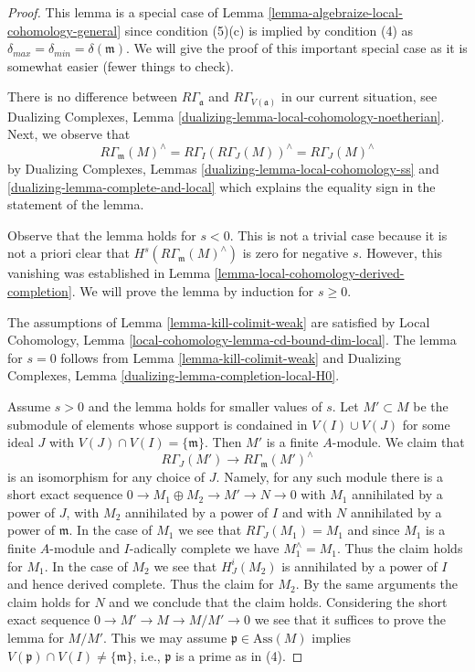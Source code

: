 \documentclass{stacks-project}
\theoremstyle{plain}
\theoremstyle{definition}
\theoremstyle{remark}
\numberwithin{equation}{subsection}
\begin{document}
\begin{proof}
This lemma is a special case of
Lemma \ref{lemma-algebraize-local-cohomology-general}
since condition (5)(c) is implied by condition (4)
as $\delta_{max} = \delta_{min} = \delta(\mathfrak m)$.
We will give the proof of this important special case
as it is somewhat easier (fewer things to check).

\medskip\noindent
There is no difference between $R\Gamma_\mathfrak a$ and
$R\Gamma_{V(\mathfrak a)}$ in our current situation, see
Dualizing Complexes, Lemma \ref{dualizing-lemma-local-cohomology-noetherian}.
Next, we observe that
$$
R\Gamma_\mathfrak m(M)^\wedge =
R\Gamma_I(R\Gamma_J(M))^\wedge =
R\Gamma_J(M)^\wedge
$$
by Dualizing Complexes, Lemmas \ref{dualizing-lemma-local-cohomology-ss} and
\ref{dualizing-lemma-complete-and-local}
which explains the equality sign in the statement of the lemma.

\medskip\noindent
Observe that the lemma holds for $s < 0$. This is not a trivial case because
it is not a priori clear that $H^s(R\Gamma_\mathfrak m(M)^\wedge)$
is zero for negative $s$. However, this vanishing was established
in Lemma \ref{lemma-local-cohomology-derived-completion}.
We will prove the lemma by induction for $s \geq 0$.

\medskip\noindent
The assumptions of Lemma \ref{lemma-kill-colimit-weak}
are satisfied by Local Cohomology, Lemma
\ref{local-cohomology-lemma-cd-bound-dim-local}.
The lemma for $s = 0$ follows from Lemma \ref{lemma-kill-colimit-weak} and
Dualizing Complexes, Lemma \ref{dualizing-lemma-completion-local-H0}.

\medskip\noindent
Assume $s > 0$ and the lemma holds for smaller values of $s$.
Let $M' \subset M$ be the submodule of elements whose
support is condained in $V(I) \cup V(J)$ for some
ideal $J$ with $V(J) \cap V(I) = \{\mathfrak m\}$.
Then $M'$ is a finite $A$-module.
We claim that
$$
R\Gamma_J(M') \to R\Gamma_\mathfrak m(M')^\wedge
$$
is an isomorphism for any choice of $J$.
Namely, for any such module there is a short exact sequence
$0 \to M_1 \oplus M_2 \to M' \to N \to 0$ with
$M_1$ annihilated by a power of $J$, with $M_2$ annihilated
by a power of $I$ and with $N$ annihilated by a power of $\mathfrak m$.
In the case of $M_1$ we see that $R\Gamma_J(M_1) = M_1$ and
since $M_1$ is a finite $A$-module and $I$-adically complete
we have $M_1^\wedge = M_1$. Thus the claim holds for $M_1$.
In the case of $M_2$ we see that $H^i_J(M_2)$ is annihilated
by a power of $I$ and hence derived complete. Thus the claim
for $M_2$. By the same arguments the claim holds for $N$
and we conclude that the claim holds. Considering the
short exact sequence $0 \to M' \to M \to M/M' \to 0$
we see that it suffices to prove the lemma for $M/M'$.
This we may assume $\mathfrak p \in \text{Ass}(M)$
implies $V(\mathfrak p) \cap V(I) \not = \{\mathfrak m\}$, i.e.,
$\mathfrak p$ is a prime as in (4).


\end{proof}
\end{document}
